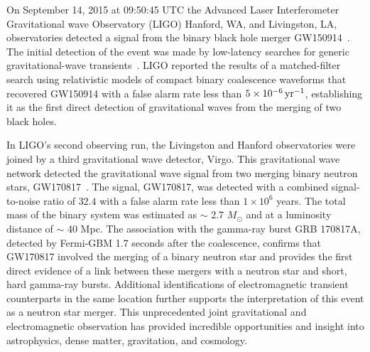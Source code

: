 On September 14, 2015 at 09:50:45 UTC the Advanced Laser Interferometer Gravitational wave Observatory (LIGO) Hanford, WA, and Livingston, LA, observatories detected a signal from the binary black hole merger GW150914~\cite{GW150914-DETECTION}. The initial detection of the event was made by low-latency searches for generic gravitational-wave transients~\cite{GW150914-BURST}. LIGO reported the results of a matched-filter search using relativistic models of compact binary coalescence waveforms that recovered GW150914 with a false alarm rate less than $5 \times 10^{-6}\,\text{yr}^{-1}$, establishing it as the first direct detection of gravitational waves from the merging of two black holes.

In LIGO's second observing run, the Livingston and Hanford observatories were joined by a third gravitational wave detector, Virgo. This gravitational wave network detected the gravitational wave signal from two merging binary neutron stars, GW170817~\cite{abbott2017gw170817}. The signal, GW170817, was detected with a combined signal-to-noise ratio of $32.4$ with a false alarm rate less than $1 \times 10^6$ years. The total mass of the binary system was estimated as $\sim$ 2.7 $M_\odot$ and at a luminosity distance of $\sim$ 40 Mpc. The association with the gamma-ray burst GRB 170817A, detected by Fermi-GBM 1.7 seconds after the coalescence, confirms that GW170817 involved the merging of a binary neutron star and provides the first direct evidence of a link between these mergers with a neutron star and short, hard gamma-ray bursts. Additional identifications of electromagnetic transient counterparts in the same location further supports the interpretation of this event as a neutron star merger. This unprecedented joint gravitational and electromagnetic observation has provided incredible opportunities and insight into astrophysics, dense matter, gravitation, and cosmology.

